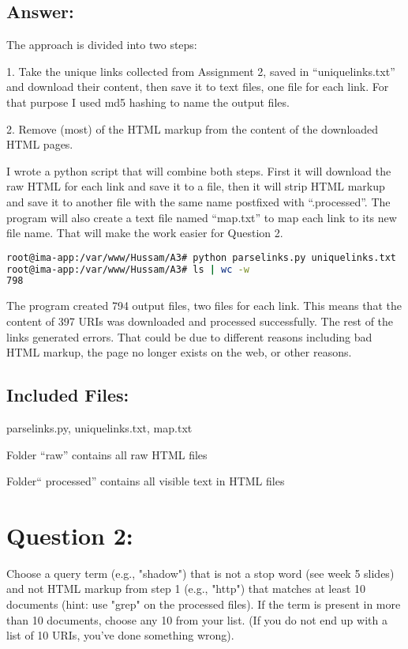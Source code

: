 \documentclass[a4paper, 11pt]{article}
\begin{document}
\subsection*{Answer:}
The approach is divided into two steps:

1. Take the unique links collected from Assignment 2, saved in ``uniquelinks.txt'' and download their content, then save it to text files, one file for each link. For that purpose I used md5 hashing to name the output files.

2. Remove (most) of the HTML markup from the content of the downloaded HTML pages.

I wrote a python script that will combine both steps. First it will download the raw HTML for each link and save it to a file, then it will strip HTML markup and save it to another file with the same name postfixed with ``.processed''. The program will also create a text file named ``map.txt'' to map each link to its new file name. That will make the work easier for Question 2.


\pagebreak

\begin{lstlisting}[language=bash, breakatwhitespace=〈false), label=running parselinks.py, caption= Running parselinks.py to download raw HTML and visible text from URIs]
root@ima-app:/var/www/Hussam/A3# python parselinks.py uniquelinks.txt
root@ima-app:/var/www/Hussam/A3# ls | wc -w
798
\end{lstlisting}


The program created 794 output files, two files for each link. This means that the content of 397 URIs was downloaded and processed successfully. The rest of the links generated errors. That could be due to different reasons including bad HTML markup, the page no longer exists on the web, or other reasons. 


\subsection*{Included Files:}
parselinks.py, uniquelinks.txt, map.txt

\noindent
Folder ``raw'' contains all raw HTML files
 
\noindent
Folder`` processed'' contains all visible text in HTML files

\section*{Question 2:}
Choose a query term (e.g., "shadow") that is not a stop word
(see week 5 slides) and not HTML markup from step 1 (e.g., "http")
that matches at least 10 documents (hint: use "grep" on the processed
files).  If the term is present in more than 10 documents, choose
any 10 from your list.  (If you do not end up with a list of 10
URIs, you've done something wrong).
\end{document}
